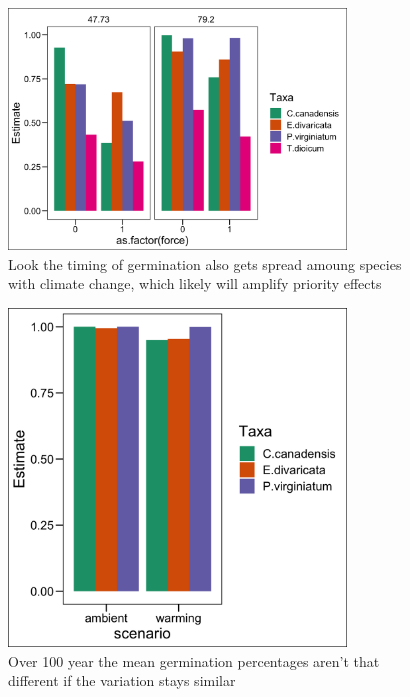 \documentclass[11pt]{article}
\begin{document}
\begin{figure}[h!]
        \centering
        \includegraphics[width=0.8\textwidth]{..//figures/germtime.png}
          \caption{Look the timing of germination also gets spread amoung species with climate change, which likely will amplify priority effects}
        \label{fig:germtime}
      
  \end{figure} 
  
  \begin{figure}[h!]
        \centering
        \includegraphics[width=0.8\textwidth]{..//figures/germpercs_wvar.png}
          \caption{Over 100 year the mean germination percentages aren't that different if the variation stays similar}
        \label{fig:germpercswvar}
    \end{figure}
    
\end{document}

